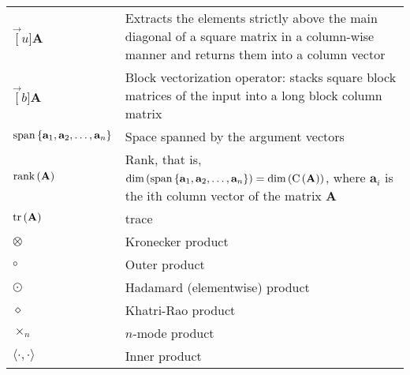 \documentclass{article}
\newcommand{\tr}[1]{\ensuremath{\textnormal{tr}\left(#1\right)}} %
\renewcommand{\dim}[1]{\ensuremath{\textnormal{dim}\left(#1\right)}} %
\renewcommand{\span}[1]{\ensuremath{\textnormal{span}\left\{#1\right\}}} %
\newcommand{\range}[1]{\ensuremath{\textnormal{C}\left(#1\right)}} %
\newcommand{\rank}[1]{\ensuremath{\textnormal{rank}\left(#1\right)}} %
\newcommand{\inner}[2]{\ensuremath{\langle#1,#2\rangle}} %
\begin{document}
\begin{table}[H]
\begin{tabularx}{\textwidth}{XX}
        \(\vec[u]{\mathbf{A}}\) & Extracts the elements strictly above the main diagonal of a square matrix in a column-wise manner and returns them into a column vector\\
        \(\vec[b]{\mathbf{A}}\) & Block vectorization operator: stacks square block matrices of the input into a long block column matrix\\
        \(\span{\mathbf{a}_1, \mathbf{a}_2, \dots, \mathbf{a}_n}\) & Space spanned by the argument vectors\\
        \(\rank{\mathbf{A}}\) & Rank, that is, \(\dim{\span{\mathbf{a}_1,\mathbf{a}_2, \dots, \mathbf{a}_n}} = \dim{\range{\mathbf{A}}}\), where \(\mathbf{a}_i\) is the ith column vector of the matrix \(\mathbf{A}\)\\
        \(\tr{\mathbf{A}}\)& trace\\
        \(\otimes\) & Kronecker product\\
        \(\circ\) & Outer product\\
        \(\odot\) & Hadamard (elementwise) product\\
        \(\diamond\) & Khatri-Rao product\\
        \(\times_n\) & \(n\)-mode product\\
        \(\inner{\cdot}{\cdot}\) & Inner product
    \end{tabularx}
\end{table}
\end{document}
